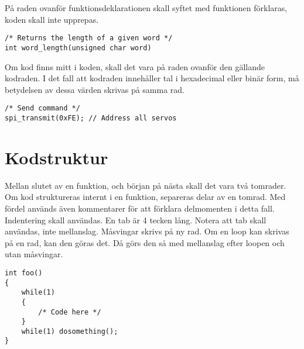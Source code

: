 \documentclass[titlepage, a4paper]{article}
\begin{document}
På raden ovanför funktionsdeklarationen skall syftet med funktionen förklaras, koden skall inte upprepas.

\begin{lstlisting}
/* Returns the length of a given word */
int word_length(unsigned char word)
\end{lstlisting}

Om kod finns mitt i koden, skall det vara på raden ovanför den gällande kodraden. I det fall att kodraden innehåller tal i hexadecimal eller binär form, må betydelsen av dessa värden skrivas på samma rad.

\begin{lstlisting}
/* Send command */
spi_transmit(0xFE); // Address all servos

\end{lstlisting}

\section{Kodstruktur}
Mellan slutet av en funktion, och början på nästa skall det vara två tomrader. Om kod struktureras internt i en funktion, separeras delar av en tomrad. Med fördel används även kommentarer för att förklara delmomenten i detta fall. \\
Indentering skall användas. En tab är 4 tecken lång. Notera att tab skall användas, inte mellanslag. Måsvingar skrivs på ny rad. Om en loop kan skrivas på en rad, kan den göras det. Då görs den så med mellanslag efter loopen och utan måsvingar.

\begin{lstlisting}
int foo()
{
    while(1)
    {
        /* Code here */
    }
    while(1) dosomething();
}
\end{lstlisting}
\end{document}
